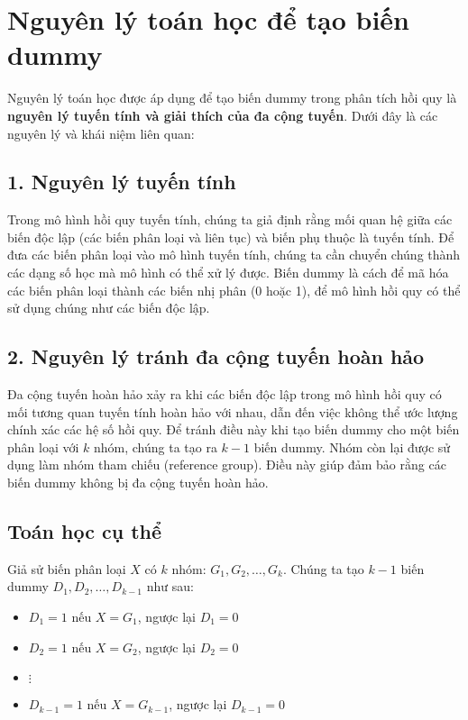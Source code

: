 \documentclass{article}
\begin{document}
\section*{Nguyên lý toán học để tạo biến dummy}

Nguyên lý toán học được áp dụng để tạo biến dummy trong phân tích hồi quy là \textbf{nguyên lý tuyến tính và giải thích của đa cộng tuyến}. Dưới đây là các nguyên lý và khái niệm liên quan:

\subsection*{1. Nguyên lý tuyến tính}
Trong mô hình hồi quy tuyến tính, chúng ta giả định rằng mối quan hệ giữa các biến độc lập (các biến phân loại và liên tục) và biến phụ thuộc là tuyến tính. Để đưa các biến phân loại vào mô hình tuyến tính, chúng ta cần chuyển chúng thành các dạng số học mà mô hình có thể xử lý được. Biến dummy là cách để mã hóa các biến phân loại thành các biến nhị phân (0 hoặc 1), để mô hình hồi quy có thể sử dụng chúng như các biến độc lập.

\subsection*{2. Nguyên lý tránh đa cộng tuyến hoàn hảo}
Đa cộng tuyến hoàn hảo xảy ra khi các biến độc lập trong mô hình hồi quy có mối tương quan tuyến tính hoàn hảo với nhau, dẫn đến việc không thể ước lượng chính xác các hệ số hồi quy. Để tránh điều này khi tạo biến dummy cho một biến phân loại với \(k\) nhóm, chúng ta tạo ra \(k-1\) biến dummy. Nhóm còn lại được sử dụng làm nhóm tham chiếu (reference group). Điều này giúp đảm bảo rằng các biến dummy không bị đa cộng tuyến hoàn hảo.

\subsection*{Toán học cụ thể}

Giả sử biến phân loại \(X\) có \(k\) nhóm: \(G_1, G_2, \ldots, G_k\). Chúng ta tạo \(k-1\) biến dummy \(D_1, D_2, \ldots, D_{k-1}\) như sau:
\begin{itemize}
    \item \(D_1 = 1\) nếu \(X = G_1\), ngược lại \(D_1 = 0\)
    \item \(D_2 = 1\) nếu \(X = G_2\), ngược lại \(D_2 = 0\)
    \item \(\vdots\)
    \item \(D_{k-1} = 1\) nếu \(X = G_{k-1}\), ngược lại \(D_{k-1} = 0\)
\end{itemize}
\end{document}
